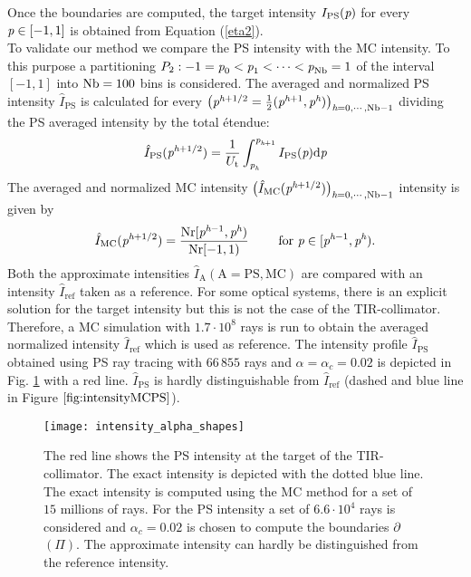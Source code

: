 Once the boundaries are computed, the target intensity $I_{\textrm{PS}}(\textit{p})$ for every $\textit{p}\in[-1,1]$ is obtained from Equation (\ref{eta2}). \\ \indent
To validate our method we compare the PS intensity with the MC intensity. 
To this purpose a partitioning $P_2:-1=\textit{p}_{0}<\textit{p}_1<\cdots<\textit{p}_{\textrm{Nb}}=1$ of the interval $[-1,1]$ into $\textrm{Nb}=100$ bins is considered. 
The averaged and normalized PS intensity $\hat{I}_{\textrm{PS}}$ is calculated for every 
$\big(\textit{p}^{\textit{h}+1/2} = \frac{1}{2}(\textit{p}^{\textit{h}+1}, \textit{p}^{\textit{h}})\big)_{\textit{h}=0, \cdots, \textrm{Nb}-1}$ dividing the PS averaged intensity by the total \'{e}tendue:
\begin{equation}\label{eq:normalized_PS_intensity}
\hat{I}_{\textrm{PS}}(\textit{p}^{\textit{h}+1/2}) = \frac{1}{U_{\textrm{t}}}\int_{\textit{p}_{\textit{h}}}^{\textit{p}_{\textit{h}+1}} I_{\textrm{PS}}(\textit{p})\textrm{d}\textit{p}
\end{equation}
The averaged and normalized MC intensity $\big(\hat{I}_{\textrm{MC}}(\textit{p}^{\textit{h}+1/2})\big)_{\textit{h} = 0, \cdots, \textrm{Nb}-1}$ intensity is given by
\begin{equation}\label{eq:normalized_MC_intensity}
\hat{I}_{\textrm{MC}}(\textit{p}^{\textit{h}+1/2}) = \frac{\textrm{Nr}[\textit{p}^{\textit{h}-1},\textit{p}^{\textit{h}})}{\textrm{Nr} [-1,1)} 
\qquad \mbox{ for } \textit{p}\in[\textit{p}^{\textit{h}-1}, \textit{p}^{\textit{h}}).
\end{equation} 
Both the approximate intensities $\hat{I}_{\textrm{A}} (\textrm{A} = \textrm{PS}, \textrm{MC})$ are compared with an intensity $\hat{I}_{\textrm{ref}}$ taken as a reference. For some optical systems, there is an explicit solution for the target intensity but this is not the case of the TIR-collimator.
Therefore, a MC simulation with $1.7 \cdot 10^8$ rays is run to obtain the averaged normalized intensity $\hat{I}_{\mbox{ref}}$ which is used as reference.
The intensity profile $\hat{I}_{\textrm{PS}}
$ obtained using PS ray tracing with $66\,855$ rays and $\alpha= \alpha_c = 0.02$ is depicted in Fig. \ref{fig:intensityMCPS} with a red line.
$\hat{I}_{\textrm{PS}}$ is hardly distinguishable from $\hat{I}_{\mbox{ref}}$ (dashed and blue line in Figure $\ref{fig:intensityMCPS}$).\\ \indent
  \begin{figure}[h]
    \centering
    \texttt{[image: intensity\_alpha\_shapes]}
\caption{The red line shows the PS intensity at the target of the TIR-collimator. The exact intensity is depicted with the dotted blue line.
The exact intensity is computed using the MC method for a set of $15$ millions of rays. For the PS intensity a set of $6.6\cdot 10^4$
rays is considered and $\alpha_c = 0.02$ is chosen to compute the boundaries $\partial$$(\Pi)$. The approximate intensity can hardly be distinguished from the reference intensity.}
  \label{fig:intensityMCPS}
\end{figure}
